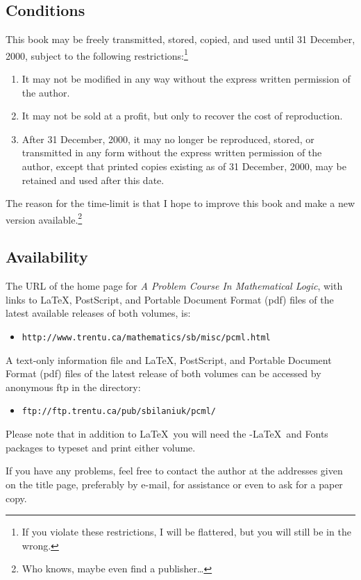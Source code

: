 \documentclass[12pt]{amsbook}
\theoremstyle{plain}
\theoremstyle{definition}
\theoremstyle{remark}
\begin{document}
\subsection*{Conditions}
This book may be freely transmitted,  stored,  copied,  and used until 31 December,  2000,  subject to the following restrictions:\footnote{If you violate these restrictions,  I will be flattered,  but you will still be in the wrong.}
\begin{enumerate}
\item It may not be modified in any way without the express written permission of the author.
\item It may not be sold at a profit,  but only to recover the cost of reproduction.
\item After 31 December,  2000,  it may no longer be reproduced,  stored,  or transmitted in any form without the express written permission of the author,  except that printed copies existing as of 31 December,  2000,  may be retained and used after this date.
\end{enumerate}

The reason for the time-limit is that I hope to improve this book and make a new version available.\footnote{Who knows,  maybe even find a publisher\dots}

\subsection*{Availability}
The URL of the home page for {\em A Problem Course In Mathematical Logic\/},  with links to \LaTeX,  PostScript,  and Portable Document Format (pdf) files of the latest available releases of both volumes,  is:
\begin{itemize}
\item {\tt http://www.trentu.ca/mathematics/sb/misc/pcml.html}
\end{itemize}
A text-only information file and \LaTeX,  PostScript,  and Portable Document Format (pdf) files of the latest release of both volumes can be accessed by anonymous ftp in the directory:
\begin{itemize}
\item {\tt ftp://ftp.trentu.ca/pub/sbilaniuk/pcml/}
\end{itemize}
Please note that in addition to \LaTeX\ you will need the \AmS-\LaTeX\ and \AmS Fonts packages to typeset and print either volume.

If you have any problems,  feel free to contact the author at the addresses given on the title page,  preferably by e-mail,  for assistance or even to ask for a paper copy.
\end{document}

